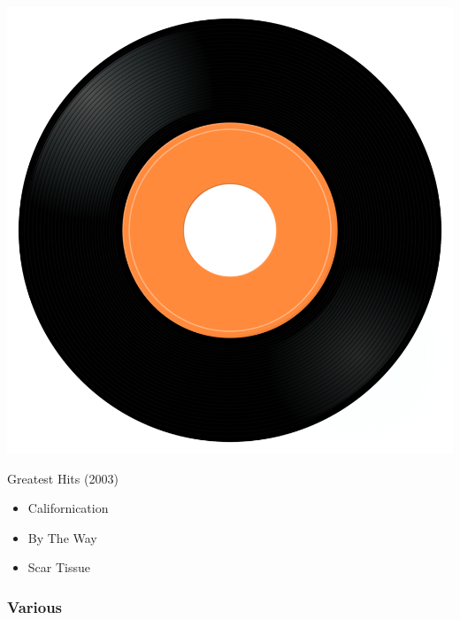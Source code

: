\begin{minipage}[t]{0.25\textwidth}
\captionsetup{type=figure}
\includegraphics[width=\textwidth]{Images/cover.png}
\caption*{Greatest Hits (2003)}
\end{minipage}
\begin{minipage}[t]{0.25\textwidth}\vspace{0pt}
\begin{itemize}[nosep,leftmargin=1em,labelwidth=*,align=left]
	\setlength{\itemsep}{0pt}
	\item Californication 
	\item By The Way
	\item Scar Tissue
\end{itemize}
\end{minipage}

\subsubsection{Various}

